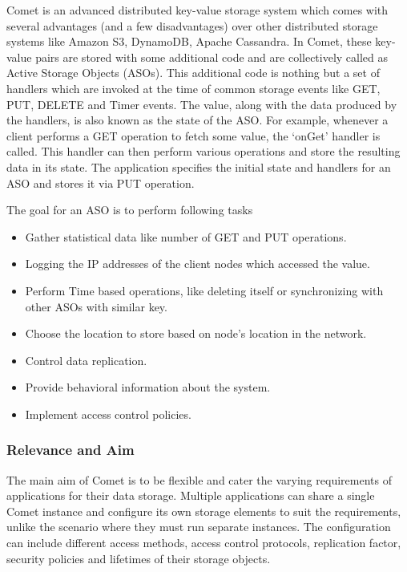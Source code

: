 \documentclass[11pt,a4paper]{article}
\begin{document}
    Comet \cite{CometGeambasu} is an advanced distributed key-value storage system which comes with several advantages (and a few disadvantages) over other distributed storage systems like Amazon S3, DynamoDB, Apache Cassandra. In Comet, these key-value pairs are stored with some additional code and are collectively called as Active Storage Objects (ASOs). This additional code is nothing but a set of handlers which are invoked at the time of common storage events like GET, PUT, DELETE and Timer events. The value, along with the data produced by the handlers, is also known as the state of the ASO. For example, whenever a client performs a GET operation to fetch some value, the ‘onGet’ handler is called. This handler can then perform various operations and store the resulting data in its state. The application specifies the initial state and handlers for an ASO and stores it via PUT operation.
    
    The goal for an ASO is to perform following tasks
    
    \begin{itemize}
        \item Gather statistical data like number of GET and PUT operations.
        \item Logging the IP addresses of the client nodes which accessed the value.
        \item Perform Time based operations, like deleting itself or synchronizing with other ASOs with similar key.
        \item Choose the location to store based on node’s location in the network.
        \item Control data replication.
        \item Provide behavioral information about the system.
        \item Implement access control policies.
    \end{itemize}
    
    \subsubsection{Relevance and Aim}
    
    The main aim of Comet is to be flexible and cater the varying requirements of applications for their data storage. Multiple applications can share a single Comet instance and configure its own storage elements to suit the requirements, unlike the scenario where they must run separate instances. The configuration can include different access methods, access control protocols, replication factor, security policies and lifetimes of their storage objects.
    
\end{document}
